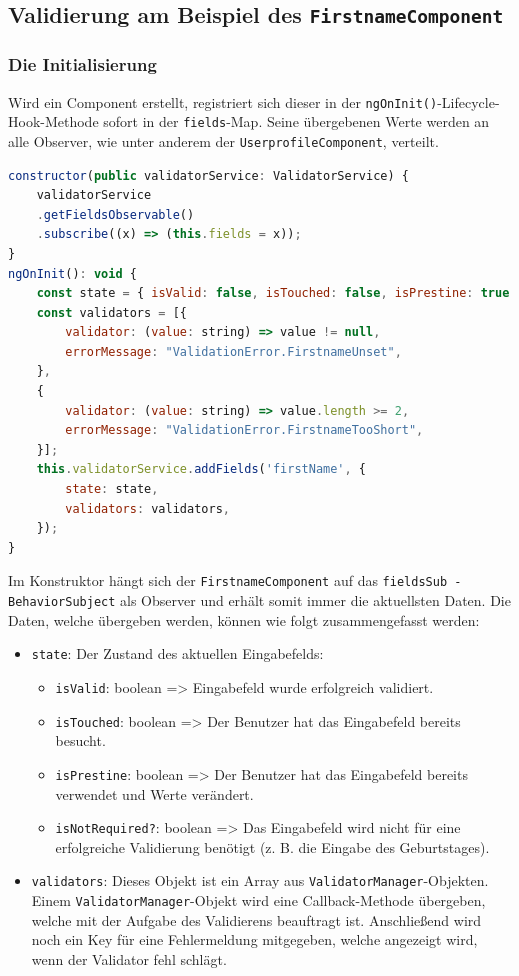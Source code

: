 \subsection{Validierung am Beispiel des \texttt{FirstnameComponent}}
\subsubsection{Die Initialisierung}
Wird ein Component erstellt, registriert sich dieser in der \texttt{ngOnInit()}-Lifecycle-Hook-Methode sofort in der \texttt{fields}-Map. Seine übergebenen Werte werden an alle Observer, wie unter anderem der \texttt{UserprofileComponent}, verteilt. 

\begin{lstlisting}[caption={Der Konstruktor und die \texttt{ngOnInit()}-Lifecycle-Hook-Methode des \\ \texttt{FirstnameComponent}}, language=JavaScript]
constructor(public validatorService: ValidatorService) {
	validatorService
	.getFieldsObservable()
	.subscribe((x) => (this.fields = x));
}
ngOnInit(): void {
	const state = { isValid: false, isTouched: false, isPrestine: true };
	const validators = [{
		validator: (value: string) => value != null,
		errorMessage: "ValidationError.FirstnameUnset",
	},
	{
		validator: (value: string) => value.length >= 2,
		errorMessage: "ValidationError.FirstnameTooShort",
	}];
	this.validatorService.addFields('firstName', {
		state: state,
		validators: validators,
	});
}
\end{lstlisting}

Im Konstruktor hängt sich der \texttt{FirstnameComponent} auf das \texttt{fieldsSub - Behavior\-Subject} als Observer und erhält somit immer die aktuellsten Daten. Die Daten, welche übergeben werden, können wie folgt zusammengefasst werden:

\begin{itemize}
	
	\item \texttt{state}: Der Zustand des aktuellen Eingabefelds:
		\begin{itemize}
			\item	\texttt{isValid}: boolean => Eingabefeld wurde erfolgreich validiert.
			\item	\texttt{isTouched}: boolean => Der Benutzer hat das Eingabefeld bereits besucht.
			\item	\texttt{isPrestine}: boolean => Der Benutzer hat das Eingabefeld bereits verwendet und Werte verändert.
			\item	\texttt{isNotRequired?}: boolean => Das Eingabefeld wird nicht für eine erfolgreiche Validierung benötigt (z. B. die Eingabe des Geburtstages).
		\end{itemize}
	\item \texttt{validators}: Dieses Objekt ist ein Array aus \texttt{ValidatorManager}-Objekten. Einem \texttt{ValidatorManager}-Objekt wird eine Callback-Methode übergeben, welche mit der Aufgabe des Validierens beauftragt ist. Anschließend wird noch ein Key für eine Fehlermeldung mitgegeben, welche angezeigt wird, wenn der Validator fehl schlägt. 
\end{itemize}


